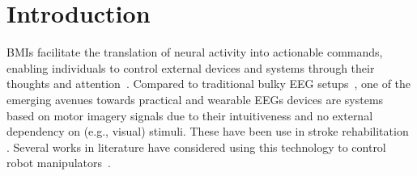 \documentclass[letterpaper, 10pt, conference]{ieeeconf}      %
\begin{document}
\begin{abstract}

\end{abstract}




\section{Introduction}
\glspl{BMI} \cite{liu2024cognitive} facilitate the translation of neural activity into actionable commands, enabling individuals to control external devices and systems through their thoughts and attention~\cite{coyle2007brain,lee2017brain}. Compared to traditional bulky EEG setups~\cite{van2012brain}, one of the emerging avenues towards practical and wearable \glspl{EEG} devices are systems based on motor imagery signals due to their intuitiveness and no external dependency on (e.g., visual) stimuli. These have been use in stroke rehabilitation \cite{khan2020review}. Several works in literature have considered using this technology to control robot manipulators~\cite{schiatti2017soft,aldini2019effect,lee2024noir}. %
\end{document}
